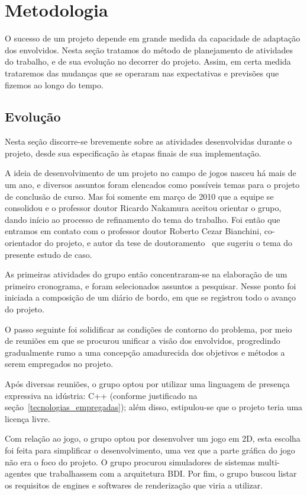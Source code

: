 \chapter{Metodologia}

O sucesso de um projeto depende em grande medida da capacidade de
adaptação dos envolvidos. Nesta seção tratamos do método de
planejamento de atividades do trabalho, e de sua evolução no decorrer
do projeto. Assim, em certa medida trataremos das mudanças que se
operaram nas expectativas e previsões que fizemos ao longo do tempo.

\section{Evolução}

Nesta seção discorre-se brevemente sobre as atividades desenvolvidas durante o projeto, desde sua especificação às etapas finais de sua implementação.

A ideia de desenvolvimento de um projeto no campo de jogos nasceu há mais de um ano, e diversos assuntos foram elencados como possíveis temas para o projeto de conclusão de curso. Mas foi somente em março de 2010 que a equipe se consolidou e o professor doutor Ricardo Nakamura aceitou orientar o grupo, dando início ao processo de refinamento do tema do trabalho. Foi então que entramos em contato com o professor doutor Roberto Cezar Bianchini, co-orientador do projeto, e autor da tese de doutoramento~\cite{tese_roberto} que sugeriu o tema do presente estudo de caso.  

As primeiras atividades do grupo então concentraram-se na elaboração de um primeiro cronograma, e foram selecionados assuntos a pesquisar. Nesse ponto foi iniciada a composição de um diário de bordo, em que se registrou todo o avanço do projeto.

O passo seguinte foi solidificar as condições de contorno do problema, por meio de reuniões em que se procurou unificar a visão dos envolvidos, progredindo gradualmente rumo a uma concepção amadurecida dos objetivos e métodos a serem empregados no projeto.

Após diversas reuniões, o grupo optou por utilizar uma linguagem de presença expressiva na idústria: C++ (conforme justificado na seção~\ref{tecnologias_empregadas}); além disso, estipulou-se que o projeto teria uma licença livre.

Com relação ao jogo, o grupo optou por desenvolver um jogo em 2D, esta escolha foi feita para simplificar o desenvolvimento, uma vez que a parte gráfica do jogo não era o foco do projeto.
O grupo procurou simuladores de sistemas multi-agentes que trabalhassem com a arquitetura BDI. Por fim, o grupo buscou listar os requisitos de engines e softwares de renderização que viria a utilizar.

